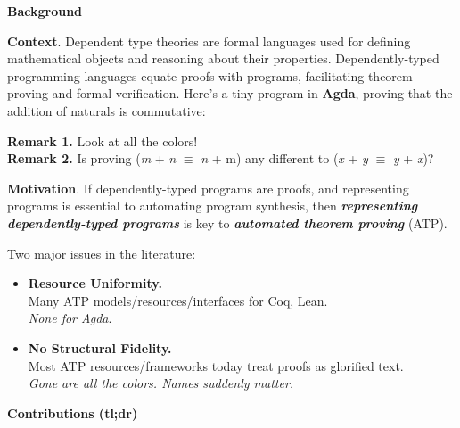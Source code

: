 \documentclass{article}
\newcommand{\sectionfont}{\fontsize{34}{34}\selectfont\setlength{\parskip}{1\baselineskip}}
\newcommand{\nfont}{\fontsize{21}{22}\selectfont\setlength{\parskip}{1\baselineskip}}
\newcommand{\light}[1]{\textcolor{gray!90}{#1}}
\begin{document}
	\begin{minipage}[t]{0.29\textwidth}
	{\sectionfont\textbf{Background}}
	\nfont
	
	\textbf{Context}. Dependent type theories are formal languages used for defining mathematical objects and reasoning about their properties. Dependently-typed programming languages equate proofs with programs, facilitating theorem proving and formal verification. Here's a tiny program in \textbf{Agda}, proving that the addition of naturals is commutative:
	
	\hfill\begin{minipage}{0.9\textwidth}
		
	\end{minipage}
	
	\vspace{-0.5\parskip}
	\hfill\begin{minipage}{0.95\textwidth}
	\light{\textbf{Remark 1.} Look at all the colors! }\\	
	\light{\textbf{Remark 2.} Is proving (\textit{m} + \textit{n} $\equiv$ \textit{n} + m) any different to (\textit{x} + \textit{y} $\equiv$ \textit{y} + \textit{x})? \emoji{thinking}}	
	\end{minipage}
	
	\textbf{Motivation}. If dependently-typed programs are proofs, and representing programs is essential to automating program synthesis, then \textbf{\textit{representing dependently-typed programs}} is key to \textbf{\textit{automated theorem proving}} (ATP).
		
	Two major issues in the literature:
	\begin{itemize}[topsep=-0.75\baselineskip]
		\item \textbf{Resource Uniformity.}\\
		Many ATP models/resources/interfaces for Coq, Lean.\\
		\textit{None for Agda}.
		\item \textbf{No Structural Fidelity.}\\
		Most ATP resources/frameworks today treat proofs as glorified text.\\
		\textit{Gone are all the colors. Names suddenly matter.}
	\end{itemize}

	{\sectionfont\vspace{\parskip}\textbf{Contributions (tl;dr)}}	
	\nfont
	

\end{minipage}
\end{document}
